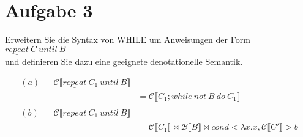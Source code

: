 \documentclass[ngerman,a4paper]{report}
\begin{document}
\section*{Aufgabe 3}
Erweitern Sie die Syntax von WHILE um Anweisungen der Form\\
$\underline{repeat}\ C\ \underline{until}\ B$\\
und definieren Sie dazu eine geeignete denotationelle Semantik.

\begin{align*}
	(a)&& \mathcal{C}\llbracket \underline{repeat}\ C_1\ \underline{until}\ B\rrbracket\\
	&&&= \mathcal{C}\llbracket C_1; \underline{while}\ \underline{not}\ B\ \underline{do}\ C_1\rrbracket\\
\\
(b)&&\mathcal{C}\llbracket\underline{repeat}\ C_1\ \underline{until}\ B\rrbracket\\
   & &&= \mathcal{C} \llbracket C_1\rrbracket\bowtie\mathcal{B}\llbracket B\rrbracket \bowtie cond <\lambda x.x, \mathcal{C}\llbracket C'\rrbracket > b
\end{align*}
\end{document}
